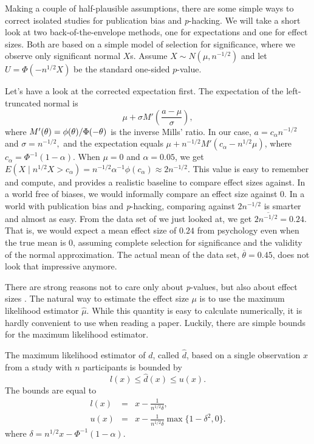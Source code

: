 Making a couple of half-plausible assumptions, there are some simple ways to correct isolated studies for publication bias and \emph{p}-hacking. We will take a short look at two back-of-the-envelope methods, one for expectations and one for effect sizes. Both are based on a simple model of selection for significance, where we observe only significant normal $X$s. Assume $X\sim N(\mu,n^{-1/2})$ and let $U=\Phi(-n^{1/2}X)$ be the standard one-sided $p$-value. 

Let's have a look at the corrected expectation first. The expectation of the left-truncated normal is \parencite[Section 10.1]{Johnson1994-ag}
\begin{equation}
\mu+\sigma M'\left(\frac{a-\mu}{\sigma}\right),\label{eq:mean of truncated normal}
\end{equation}
where
$M'(\text{\ensuremath{\theta}})=\phi(\text{\ensuremath{\theta}})/\Phi(-\text{\ensuremath{\theta}})$
is the inverse Mills' ratio. 
In our case, $a=c_{\alpha}n^{-1/2}$ and $\sigma=n^{-1/2},$ and the expectation equals $\mu+n^{-1/2}M'(c_{\alpha}-n^{1/2}\mu)$, where $c_\alpha = \Phi^{-1}(1-\alpha)$. When
$\mu=0$ and $\alpha=0.05$, we get $E(X\mid n^{1/2}X>c_{\alpha})=n^{-1/2}\alpha^{-1}\phi(c_{\alpha})\approx2n^{-1/2}.$
This value is easy to remember and compute, and provides a realistic baseline to compare effect sizes against. In a world free of biases, we would informally compare an effect size against $0$. In a world with publication bias and \emph{p}-hacking, comparing against $2n^{-1/2}$ is smarter and almost as easy. From the data set of \cite{Motyl2017-dx} we just looked at, we get $2\overline{n^{-1/2}}=0.24$. That is, we would expect a mean effect size of $0.24$ from psychology even when the true mean is $0$, assuming complete selection for significance and the validity of the normal approximation. The actual mean of the data set, $\overline{\theta}=0.45$, does not look that impressive anymore.

There are strong reasons not to care only about \emph{p}-values, but also about effect sizes \parencite{Funder2019-tg}. The natural way to
estimate the effect size $\mu$ is to use the maximum likelihood estimator $\hat{\mu}$. While this quantity is easy to calculate numerically, it is hardly convenient to use when reading a paper. Luckily, there are simple bounds for the maximum likelihood estimator.
\begin{proposition}
\label{prop:maximum likelihood bounds}The maximum likelihood estimator of $d$, called $\hat{d}$, based on a single observation $x$ from a study with $n$ participants is bounded by 
\[
l(x)\leq\hat{d}(x)\leq u(x).
\]
The bounds are equal to
\begin{eqnarray}
l(x) & = & x-\frac{1}{n^{1/2}\delta},\label{eq:lower bound}\\
u(x) & = & x-\frac{1}{n^{1/2}\delta}\max\{1-\delta^{2},0\}.\label{eq:upper bound}
\end{eqnarray}
where $\delta=n^{1/2}x-\Phi^{-1}(1-\alpha)$.
\end{proposition}

